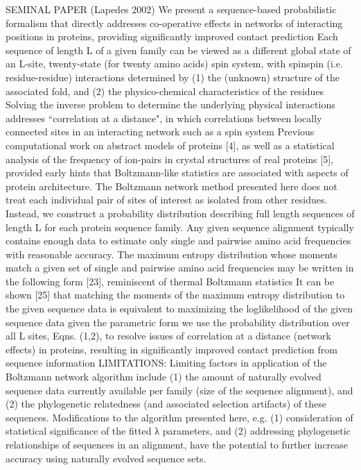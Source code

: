 SEMINAL PAPER (Lapedes 2002) We present a sequence-based probabilistic formalism that directly addresses co-operative effects in networks of interacting positions in proteins, providing significantly improved contact prediction \cite{lapedes2012using}
Each sequence of length L of a given family can be viewed as a different global state of an L-site, twenty-state (for twenty amino acids) spin system, with spinspin (i.e. residue-residue) interactions determined by (1) the (unknown) structure of the associated fold, and (2) the physico-chemical characteristics of the residues \cite{lapedes2012using}
Solving the inverse problem to determine the underlying physical interactions addresses ``correlation at a distance", in which correlations between locally connected sites in an interacting network such as a spin system \cite{lapedes2012using}
Previous computational work on abstract models of proteins [4], as well as a statistical analysis of the frequency of ion-pairs in crystal structures of real proteins [5], provided early hints that Boltzmann-like statistics are associated with aspects of protein architecture. \cite{lapedes2012using}
The Boltzmann network method presented here does not treat each individual pair of sites of interest as isolated from other residues. Instead, we construct a probability distribution describing full length sequences of length L for each protein sequence family. \cite{lapedes2012using}
Any given sequence alignment typically contains enough data to estimate only single and pairwise amino acid frequencies with reasonable accuracy. \cite{lapedes2012using}
The maximum entropy distribution whose moments match a given set of single and pairwise amino acid frequencies may be written in the following form [23], reminiscent of thermal Boltzmann statistics \cite{lapedes2012using}
It can be shown [25] that matching the moments of the maximum entropy distribution to the given sequence data is equivalent to maximizing the loglikelihood of the given sequence data given the parametric form \cite{lapedes2012using}
we use the probability distribution over all L sites, Eqns. (1,2), to resolve issues of correlation at a distance (network effects) in proteins, resulting in significantly improved contact prediction from sequence information \cite{lapedes2012using}
LIMITATIONS: Limiting factors in application of the Boltzmann network algorithm include (1) the amount of naturally evolved sequence data currently available per family (size of the sequence alignment), and (2) the phylogenetic relatedness (and associated selection artifacts) of these sequences. Modifications to the algorithm presented here, e.g. (1) consideration of statistical significance of the fitted λ parameters, and (2) addressing phylogenetic relationships of sequences in an alignment, have the potential to further increase accuracy using naturally evolved sequence sets. \cite{lapedes2012using}

